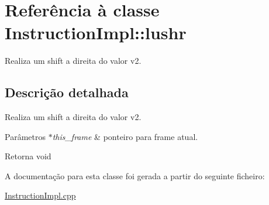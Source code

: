 \hypertarget{class_instruction_impl_1_1lushr}{}\section{Referência à classe Instruction\+Impl\+:\+:lushr}
\label{class_instruction_impl_1_1lushr}


Realiza um shift a direita do valor v2.  




\subsection{Descrição detalhada}
Realiza um shift a direita do valor v2. 


\begin{DoxyParams}{Parâmetros}
{\em $\ast$this\+\_\+frame} & ponteiro para frame atual. \\
\hline
\end{DoxyParams}
\begin{DoxyReturn}{Retorna}
void 
\end{DoxyReturn}


A documentação para esta classe foi gerada a partir do seguinte ficheiro\+:\begin{DoxyCompactItemize}
\item 
\hyperlink{_instruction_impl_8cpp}{Instruction\+Impl.\+cpp}\end{DoxyCompactItemize}
